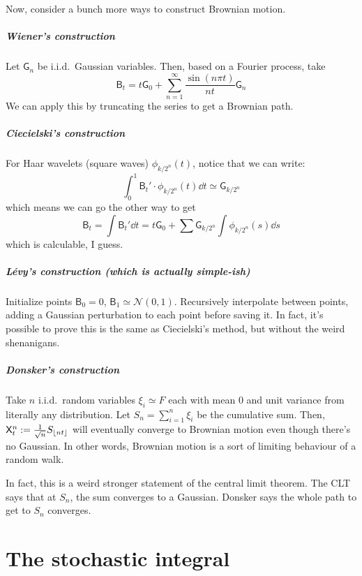 \documentclass[notes]{agony}
\newcommand{\rv}{\mathsf}
\renewcommand{\N}{\mathcal{N}}
\begin{document}
Now, consider a bunch more ways to construct Brownian motion.

\paragraph{Wiener's construction}
Let $\rv G_n$ be i.i.d.\ Gaussian variables.
Then, based on a Fourier process, take
\[ \rv B_t = t\rv G_0 + \sum_{n=1}^\infty \frac{\sin(n\pi t)}{nt} \rv G_n \]
We can apply this by truncating the series to get a Brownian path.

\paragraph{Ciecielski's construction}
For Haar wavelets (square waves) $\phi_{k/2^n}(t)$, notice that we can write:
\[
	\int_0^1 \rv B_t' \cdot \phi_{k/2^n}(t) \dd t \simeq \rv G_{k/2^n}
\]
which means we can go the other way to get
\[
	\rv B_t = \int \rv B_t' \dd{t} = t\rv G_0 + \sum \rv G_{k/2^n} \int \phi_{k/2^n}(s) \dd{s}
\]
which is calculable, I guess.

\paragraph{Lévy's construction \rm (which is actually simple-ish)}
Initialize points $\rv B_0 = 0$, $\rv B_1 \simeq \N(0,1)$.
Recursively interpolate between points, adding a Gaussian perturbation
to each point before saving it.
In fact, it's possible to prove this is the same as Ciecielski's method,
but without the weird shenanigans.

\paragraph{Donsker's construction} Take $n$ i.i.d.\ random variables $\xi_i \simeq F$
each with mean 0 and unit variance from literally any distribution.
Let $S_n = \sum_{i=1}^n \xi_i$ be the cumulative sum.
Then, $\rv X_t^n := \frac{1}{\sqrt{n}}S_{\floor{nt}}$
will eventually converge to Brownian motion even though there's no Gaussian.
In other words, Brownian motion is a sort of limiting behaviour of a random walk.

In fact, this is a weird stronger statement of the central limit theorem.
The CLT says that at $S_n$, the sum converges to a Gaussian.
Donsker says the whole path to get to $S_n$ converges.


\chapter{The stochastic integral}
\end{document}
